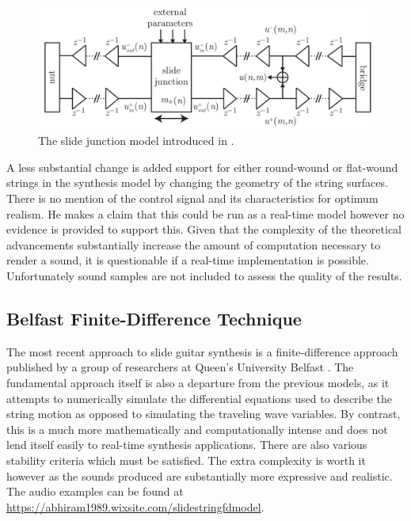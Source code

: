 \documentclass[main.tex]{subfiles}
\begin{document}
\begin{figure}[h]
    \centering
    \includegraphics[scale=.5]{./images/diagrams/EvangelistaSlideJunction.png}
    \caption{The slide junction model introduced in .}
    \label{fig:EvangelistaSlideJunction}
\end{figure}

A less substantial change is added support for either round-wound or flat-wound strings in the synthesis model by changing the geometry of the string surfaces. There is no mention of the control signal and its characteristics for optimum realism. He makes a claim that this could be run as a real-time model however no evidence is provided to support this. Given that the complexity of the theoretical advancements substantially increase the amount of computation necessary to render a sound, it is questionable if a real-time implementation is possible. Unfortunately sound samples are not included to assess the quality of the results.

\subsection{Belfast Finite-Difference Technique}
The most recent approach to slide guitar synthesis is a finite-difference approach published by a group of researchers at Queen's University Belfast . The fundamental approach itself is also a departure from the previous models, as it attempts to numerically simulate the differential equations used to describe the string motion as opposed to simulating the traveling wave variables. By contrast, this is a much more mathematically and computationally intense and does not lend itself easily to real-time synthesis applications. There are also various stability criteria which must be satisfied. The extra complexity is worth it however as the sounds produced are substantially more expressive and realistic. The audio examples can be found at \url{https://abhiram1989.wixsite.com/slidestringfdmodel}.
\end{document}
